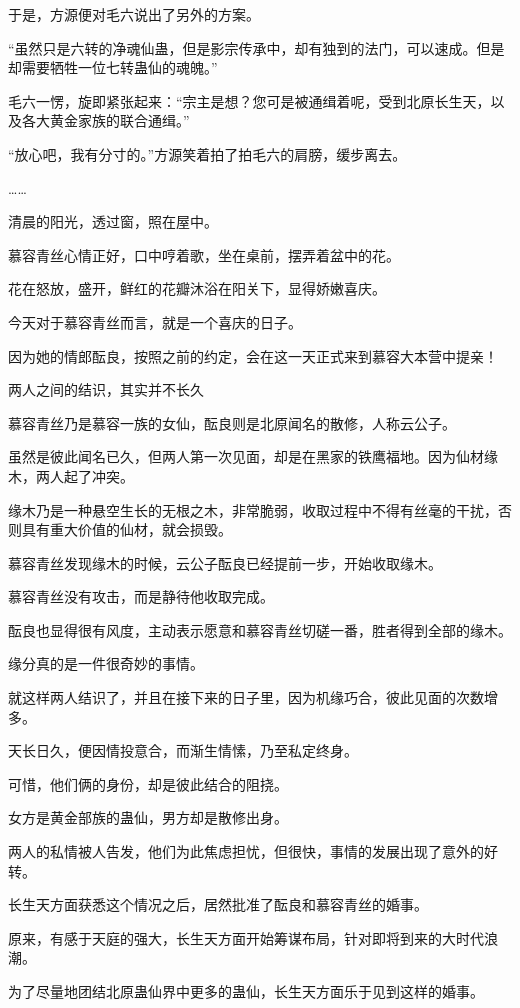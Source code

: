 \begin{this_body}
于是，方源便对毛六说出了另外的方案。

“虽然只是六转的净魂仙蛊，但是影宗传承中，却有独到的法门，可以速成。但是却需要牺牲一位七转蛊仙的魂魄。”

毛六一愣，旋即紧张起来：“宗主是想？您可是被通缉着呢，受到北原长生天，以及各大黄金家族的联合通缉。”

“放心吧，我有分寸的。”方源笑着拍了拍毛六的肩膀，缓步离去。

……

清晨的阳光，透过窗，照在屋中。

慕容青丝心情正好，口中哼着歌，坐在桌前，摆弄着盆中的花。

花在怒放，盛开，鲜红的花瓣沐浴在阳关下，显得娇嫩喜庆。

今天对于慕容青丝而言，就是一个喜庆的日子。

因为她的情郎酝良，按照之前的约定，会在这一天正式来到慕容大本营中提亲！

两人之间的结识，其实并不长久

慕容青丝乃是慕容一族的女仙，酝良则是北原闻名的散修，人称云公子。

虽然是彼此闻名已久，但两人第一次见面，却是在黑家的铁鹰福地。因为仙材缘木，两人起了冲突。

缘木乃是一种悬空生长的无根之木，非常脆弱，收取过程中不得有丝毫的干扰，否则具有重大价值的仙材，就会损毁。

慕容青丝发现缘木的时候，云公子酝良已经提前一步，开始收取缘木。

慕容青丝没有攻击，而是静待他收取完成。

酝良也显得很有风度，主动表示愿意和慕容青丝切磋一番，胜者得到全部的缘木。

缘分真的是一件很奇妙的事情。

就这样两人结识了，并且在接下来的日子里，因为机缘巧合，彼此见面的次数增多。

天长日久，便因情投意合，而渐生情愫，乃至私定终身。

可惜，他们俩的身份，却是彼此结合的阻挠。

女方是黄金部族的蛊仙，男方却是散修出身。

两人的私情被人告发，他们为此焦虑担忧，但很快，事情的发展出现了意外的好转。

长生天方面获悉这个情况之后，居然批准了酝良和慕容青丝的婚事。

原来，有感于天庭的强大，长生天方面开始筹谋布局，针对即将到来的大时代浪潮。

为了尽量地团结北原蛊仙界中更多的蛊仙，长生天方面乐于见到这样的婚事。


\end{this_body}

